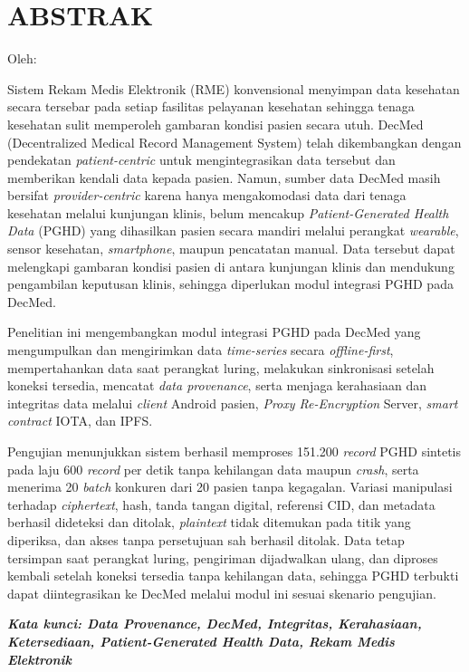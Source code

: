 \clearpage
\chapter*{ABSTRAK}
\begin{center}
    \center
    \begin{singlespace}
        \large\bfseries\MakeUppercase{\thetitle}

        \normalfont\normalsize
        Oleh:

        \bfseries \theauthor
    \end{singlespace}
\end{center}

\begin{singlespace}
\small
Sistem Rekam Medis Elektronik (RME) konvensional menyimpan data kesehatan secara tersebar pada setiap fasilitas pelayanan kesehatan sehingga tenaga kesehatan sulit memperoleh gambaran kondisi pasien secara utuh. 
DecMed (Decentralized Medical Record Management System) telah dikembangkan dengan pendekatan \textit{patient-centric} untuk mengintegrasikan data tersebut dan memberikan kendali data kepada pasien. 
Namun, sumber data DecMed masih bersifat \textit{provider-centric} karena hanya mengakomodasi data dari tenaga kesehatan melalui kunjungan klinis, belum mencakup \textit{Patient-Generated Health Data} (PGHD) yang dihasilkan pasien secara mandiri melalui perangkat \textit{wearable}, sensor kesehatan, \textit{smartphone}, maupun pencatatan manual. 
Data tersebut dapat melengkapi gambaran kondisi pasien di antara kunjungan klinis dan mendukung pengambilan keputusan klinis, sehingga diperlukan modul integrasi PGHD pada DecMed.

Penelitian ini mengembangkan modul integrasi PGHD pada DecMed yang mengumpulkan dan mengirimkan data \emph{time-series} secara \emph{offline-first}, mempertahankan data saat perangkat luring, melakukan sinkronisasi setelah koneksi tersedia, mencatat \emph{data provenance}, serta menjaga kerahasiaan dan integritas data melalui \emph{client} Android pasien, \emph{Proxy Re-Encryption} Server, \emph{smart contract} IOTA, dan IPFS\@.

Pengujian menunjukkan sistem berhasil memproses 151.200 \textit{record} PGHD sintetis pada laju 600 \textit{record} per detik tanpa kehilangan data maupun \textit{crash}, serta menerima 20 \textit{batch} konkuren dari 20 pasien tanpa kegagalan. Variasi manipulasi terhadap \textit{ciphertext}, hash, tanda tangan digital, referensi CID, dan metadata berhasil dideteksi dan ditolak, \textit{plaintext} tidak ditemukan pada titik yang diperiksa, dan akses tanpa persetujuan sah berhasil ditolak. Data tetap tersimpan saat perangkat luring, pengiriman dijadwalkan ulang, dan diproses kembali setelah koneksi tersedia tanpa kehilangan data, sehingga PGHD terbukti dapat diintegrasikan ke DecMed melalui modul ini sesuai skenario pengujian.

\textbf{\textit{Kata kunci: \textit{Data Provenance}, DecMed, Integritas, Kerahasiaan, Ketersediaan, \textit{Patient-Generated Health Data}, Rekam Medis Elektronik}}
\end{singlespace}
\clearpage